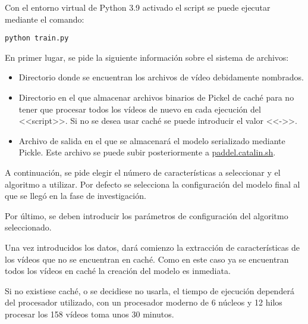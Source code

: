Con el entorno virtual de Python 3.9 activado el script se puede ejecutar
mediante el comando:

\texttt{python train.py}

En primer lugar, se pide la siguiente información sobre el sistema de archivos:

\begin{itemize}
    \item Directorio donde se encuentran los archivos de vídeo debidamente
    nombrados.
    \item Directorio en el que almacenar archivos binarios de Pickel de caché
    para no tener que procesar todos los vídeos de nuevo en cada ejecución del
    <<script>>. Si no se desea usar caché se puede introducir el valor <<->>.
    \item Archivo de salida en el que se almacenará el modelo serializado
    mediante Pickle. Este archivo se puede subir posteriormente a
    \href{https://paddel.catalin.sh}{paddel.catalin.sh}.
\end{itemize}


A continuación, se pide elegir el número de características a seleccionar y el
algoritmo a utilizar. Por defecto se selecciona la configuración del modelo
final al que se llegó en la fase de investigación.


Por último, se deben introducir los parámetros de configuración del algoritmo
seleccionado.


Una vez introducidos los datos, dará comienzo la extracción de características
de los vídeos que no se encuentran en caché. Como en este caso ya se encuentran
todos los vídeos en caché la creación del modelo es inmediata.

Si no existiese caché, o se decidiese no usarla, el tiempo de ejecución
dependerá del procesador utilizado, con un procesador moderno de 6 núcleos y 12
hilos procesar los 158 vídeos toma unos 30 minutos.
